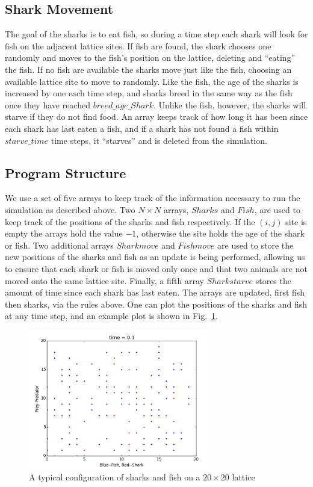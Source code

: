 \documentclass[aps,prl,preprint,superscriptaddress]{revtex4}
\begin{document}
\subsection{Shark Movement}
The goal of the sharks is to eat fish, so during a time step each shark will look for fish on the adjacent lattice sites. If fish are found, the shark chooses one randomly and moves to the fish's position on the lattice, deleting and ``eating'' the fish. If no fish are available the sharks move just like the fish, choosing an available lattice site to move to randomly. Like the fish, the age of the sharks is increased by one each time step, and sharks breed in the same way as the fish once they have reached $breed\_age\_Shark$. Unlike the fish, however, the sharks will starve if they do not find food. An array keeps track of how long it has been since each shark has last eaten a fish, and if a shark has not found a fish within $starve\_time$ time steps, it ``starves'' and is deleted from the simulation.

\subsection{Program Structure}
We use a set of five arrays to keep track of the information necessary to run the simulation as described above. Two $N \times N$ arrays, $Sharks$ and $Fish$, are used to keep track of the positions of the sharks and fish respectively. If the $(i,j)$ site is empty the arrays hold the value $-1$, otherwise the site holds the age of the shark or fish. Two additional arrays $Sharkmove$ and $Fishmove$ are used to store the new positions of the sharks and fish as an update is being performed, allowing us to ensure that each shark or fish is moved only once and that two animals are not moved onto the same lattice site. Finally, a fifth array $Sharkstarve$ stores the amount of time since each shark has last eaten. The arrays are updated, first fish then sharks, via the rules above. One can plot the positions of the sharks and fish at any time step, and an example plot is shown in Fig.~\ref{ex}.

\begin{figure}[H]
	\centering
	\includegraphics[width = 0.7\textwidth]{example}
	\caption{A typical configuration of sharks and fish on a $20 \times 20$ lattice}
	\label{ex} 
\end{figure}
\end{document}
